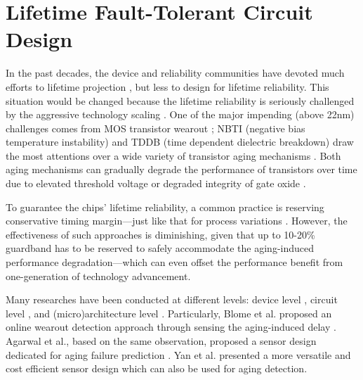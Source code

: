 \section{Lifetime Fault-Tolerant Circuit Design}
In the past decades, the device and reliability communities have devoted much efforts to lifetime projection \cite{Sony}\cite{Atmel}, but less to design for lifetime reliability. This situation would be changed because the lifetime reliability is seriously challenged by the aggressive technology scaling \cite{degradation_05}\cite{ITRS_PIDS07}. One of the major impending (above 22nm) challenges comes from MOS transistor wearout \cite{ITRS_PIDS07}; NBTI (negative bias temperature instability) and TDDB (time dependent dielectric breakdown) draw the most attentions over a wide variety of transistor aging mechanisms \cite{ITRS_PIDS07}. Both aging mechanisms can gradually degrade the performance of transistors over time \cite{agarwal2007circuit}\cite{Self-calibrating_07} due to elevated threshold voltage \cite{NBTI_Impact05}\cite{wang2007impact} or degraded integrity of gate oxide \cite{OB_Invert_03}\cite{Impact_BD_04}\cite{Gate-oxide-breakdown-07}.

To guarantee the chips' lifetime reliability, a common practice is reserving conservative timing margin---just like that for process variations \cite{ParameterVariations_DAC03}. However, the effectiveness of such approaches is diminishing, given that up to 10-20\% guardband has to be reserved to safely accommodate the aging-induced performance degradation---which can even offset the performance benefit from one-generation of technology advancement.

Many researches have been conducted at different levels: device level \cite{DynamicNBTI_03}\cite{Modeling-and-minimization_06}, circuit level \cite{Compact-Modeling_07}\cite{wang2007impact}, and (micro)architecture level \cite{Reliability-Aware_04}\cite{Penelope_07}\cite{Framework_DSN07}. Particularly, Blome et al. proposed an online wearout detection approach through sensing the aging-induced delay \cite{Self-calibrating_07}. Agarwal et al., based on the same observation, proposed a sensor design dedicated for aging failure prediction \cite{agarwal2007circuit}. Yan et al. presented a more versatile and cost efficient sensor design \cite{SVFD_09} which can also be used for aging detection.

